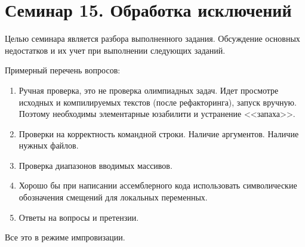 \chapter[15]{Семинар 15. Обработка исключений}

Целью семинара является разбора выполненного задания. Обсуждение основных недостатков и их учет при выполнении следующих заданий.

Примерный перечень вопросов:
\begin{enumerate}
    \item Ручная проверка, это не проверка олимпиадных задач. Идет просмотре исходных и компилируемых текстов (после рефакторинга), запуск вручную. Поэтому необходимы элементарные юзабилити и устранение <<запаха>>.
    \item Проверки на корректность командной строки. Наличие аргументов. Наличие нужных файлов.
    \item Проверка диапазонов вводимых массивов.
    \item Хорошо бы при написании ассемблерного кода использовать символические обозначения смещений для локальных переменных.
    \item Ответы на вопросы и претензии.
\end{enumerate}

Все это в режиме импровизации.
